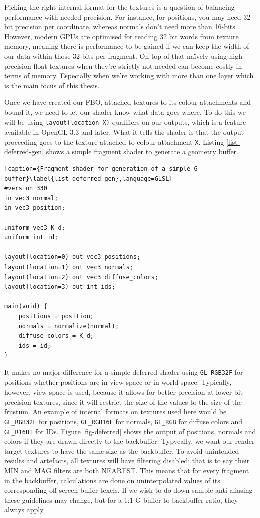Picking the right internal format for the textures is a question of balancing performance with needed precision. For instance, for positions, you may need 32-bit precision per coordinate, whereas normals don't need more than 16-bits. However, modern GPUs are optimised for reading 32 bit words from texture memory, meaning there is performance to be gained if we can keep the width of our data within those 32 bits per fragment. On top of that naïvely using high-precision float textures when they're strictly not needed can become costly in terms of memory. Especially when we're working with more than one layer which is the main focus of this thesis.

Once we have created our FBO, attached textures to its colour attachments and bound it, we need to let our shader know what data goes where. To do this we will be using \verb=layout(location X)= qualifiers on our outputs, which is a feature available in OpenGL 3.3 and later. What it tells the shader is that the output proceeding goes to the texture attached to colour attachment \verb=X=. Listing \ref{list-deferred-gen} shows a simple fragment shader to generate a geometry buffer.

\begin{lstlisting}[caption={Fragment shader for generation of a simple G-buffer}\label{list-deferred-gen},language=GLSL]
#version 330
in vec3 normal;
in vec3 position;

uniform vec3 K_d;
uniform int id;

layout(location=0) out vec3 positions;
layout(location=1) out vec3 normals;
layout(location=2) out vec3 diffuse_colors;
layout(location=3) out int ids;

main(void) {
	positions = position;
	normals = normalize(normal);
	diffuse_colors = K_d;
	ids = id;
}
\end{lstlisting}

It makes no major difference for a simple deferred shader using \verb=GL_RGB32F= for positions whether positions are in view-space or in world space. Typically, however, view-space is used, because it allows for better precision at lower bit-precision textures, since it will restrict the size of the values to the size of the frustum.
An example of internal formats on textures used here would be \verb=GL_RGB32F= for positions, \verb=GL_RGB16F= for normals, \verb=GL_RGB= for diffuse colors and \verb=GL_R16UI= for IDs. Figure \ref{fig-deferred} shows the output of positions, normals and colors if they are drawn directly to the backbuffer. Typycally, we want our render target textures to have the same size as the backbuffer. To avoid unintended results and artefacts, all textures will have filtering disabled; that is to say their MIN and MAG filters are both NEAREST. This means that for every fragment in the backbuffer, calculations are done on uninterpolated values of its corresponding off-screen buffer texels. If we wish to do down-sample anti-aliasing these guidelines may change, but for a 1:1 G-buffer to backbuffer ratio, they always apply.


